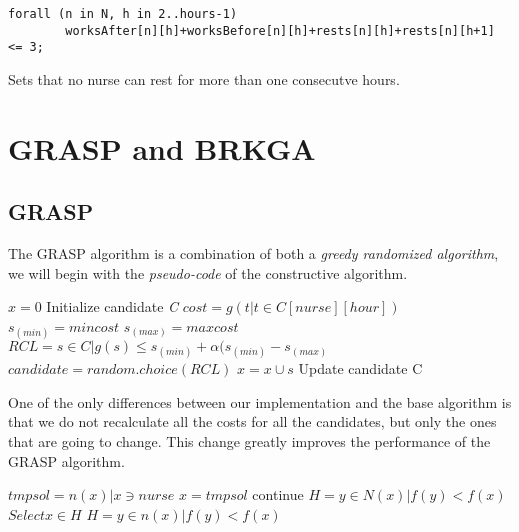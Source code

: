 \documentclass[11pt]{article}
\begin{document}
\begin{lstlisting}[style=OPL]
 	forall (n in N, h in 2..hours-1)
 		worksAfter[n][h]+worksBefore[n][h]+rests[n][h]+rests[n][h+1] <= 3;	
\end{lstlisting}
Sets that no nurse can rest for more than one consecutve hours.

\section{GRASP and BRKGA}

\subsection{GRASP}
The GRASP algorithm is a combination of both a \textit{greedy randomized algorithm}, we will begin with the \textit{pseudo-code} of the constructive algorithm.

\begin{algorithmic}
	\State $x = 0$\;
	\State Initialize candidate \textit{C}\;
		\State $cost = g(t | t \in C[nurse][hour])$
		\State $s_(min)=min{cost}$
		\State $s_(max)=max{cost}$
			\Return
		\EndIf
		\State $RCL={s \in C | g(s) \leq s_(min) + \alpha(s_(min) - s_(max)}$
		\State $candidate = random.choice(RCL)$
		\State $x=x\cup{s}$
		\State Update candidate C 
	\EndWhile	
\EndProcedure
\end{algorithmic}

One of the only differences between our implementation and the base algorithm is that we do not recalculate all the costs for all the candidates, but only the ones that are going to change. This change greatly improves the performance of the GRASP algorithm.
\newline

\begin{algorithmic}
		\State $tmpsol={n(x) | x \ni nurse}$
			\State $x=tmpsol$
			\State continue
		\EndIf
		\State $H = {y \in N(x) | f(y) < f(x)}$
			\State $Select x \in H$
			\State $H={y \in n(x) | f(y) < f(x)}$
		\EndWhile   
	\EndFor	
\EndProcedure
\end{algorithmic}
\end{document}
